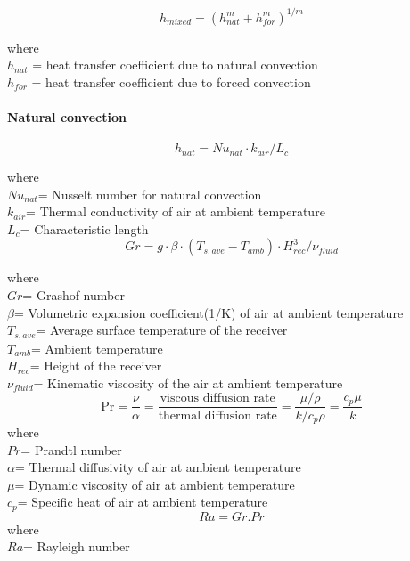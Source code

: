 \begin{equation}
h_{mixed} = (h_{nat}^m + h_{for}^m)^{1/m}
\end{equation}

where\\
$h_{nat}$ = heat transfer coefficient due to natural convection\\
$h_{for}$ = heat transfer coefficient due to forced convection
\paragraph{Natural convection}
\begin{equation}
h_{nat}=Nu_{nat}\cdot k_{air}/L_c
\end{equation}

where\\
$Nu_{nat}$= Nusselt number for natural convection\\
$k_{air}$= Thermal conductivity of air at ambient temperature\\
$L_c$= Characteristic length \\
\begin{equation}
 Gr=g \cdot \beta\cdot (T_{s,ave}-T_{amb})\cdot {H_{rec}^3/\nu_{fluid}}
\end{equation}

where\\
$Gr$= Grashof number\\
$\beta$= Volumetric expansion coefficient(1/K) of air at ambient temperature \\
$T_{s,ave}$= Average surface temperature of the receiver \\
$T_{amb}$= Ambient temperature \\
$H_{rec}$= Height of the receiver \\
$\nu_{fluid}$= Kinematic viscosity of the air at ambient temperature \\

\begin{equation}
\mathrm{Pr} = \frac{\nu}{\alpha} = \frac{\mbox{viscous diffusion rate}}{\mbox{thermal diffusion rate}} = \frac{\mu / \rho}{k / c_p \rho} = \frac{c_p \mu}{k}
\end{equation}
where\\
$Pr$= Prandtl number \\
$\alpha$= Thermal diffusivity of air at ambient temperature \\
$\mu $= Dynamic viscosity of air at ambient temperature \\
$c_p$= Specific heat of air at ambient temperature\\
\begin{equation}
 Ra=Gr.Pr
\end{equation}
where\\
$Ra$= Rayleigh number \\

